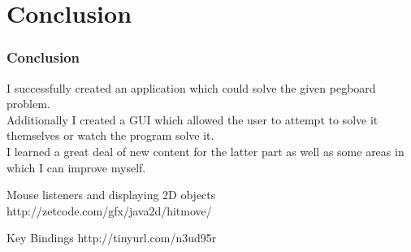 \documentclass{beamer}
\begin{document}
\section{Conclusion}	
	\begin{frame}
		\frametitle{Conclusion}
		I successfully created an application which could solve the given pegboard problem.\\\medskip
		Additionally I created a GUI which allowed the user to attempt to solve it themselves
		or watch the program solve it. \\\medskip
		I learned a great deal of new content for the latter part as well as some areas in which I can improve myself. 
		
		\blt 
			\item Mouse listeners and displaying 2D objects http://zetcode.com/gfx/java2d/hitmove/
			\item Key Bindings http://tinyurl.com/n3ud95r
		\finblt
	\end{frame}
\end{document}
